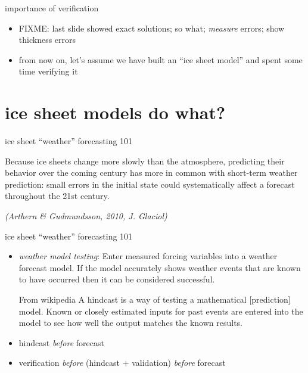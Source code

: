 \documentclass[hide notes,intlimits]{beamer}
\begin{document}
\begin{frame}{importance of verification}

\begin{itemize}
\item FIXME: last slide showed exact solutions; so what; \emph{measure} errors; show thickness errors
\item from now on, let's assume we have built an ``ice sheet model'' and spent some time verifying it
\end{itemize}
\end{frame}


\section{ice sheet models do what?}

\begin{frame}{ice sheet ``weather'' forecasting 101}

Because ice sheets change more slowly than the atmosphere, predicting their
behavior over the coming century has more in common with short-term
weather prediction: \alert{small errors in the initial state could
systematically affect a forecast throughout the 21st century}.

\medskip
\emph{(Arthern \& Gudmundsson, 2010, J. Glaciol)}
\end{frame}


\begin{frame}{ice sheet ``weather'' forecasting 101}

\begin{itemize}
\item \emph{weather model testing}:  Enter measured forcing variables into a weather forecast model.  If the model accurately shows weather events that are known to have occurred then it can be considered successful.
\bigskip

  \begin{block}{From wikipedia} A \alert{hindcast} is a way of testing a
mathematical [prediction] model. Known or closely estimated inputs for past events
are entered into the model to see how well the output matches the
known results.
  \end{block}

\bigskip
\item hindcast \emph{before} forecast
\item verification \emph{before} (hindcast $+$ validation) \emph{before} forecast
\end{itemize}
\end{frame}
\end{document}
